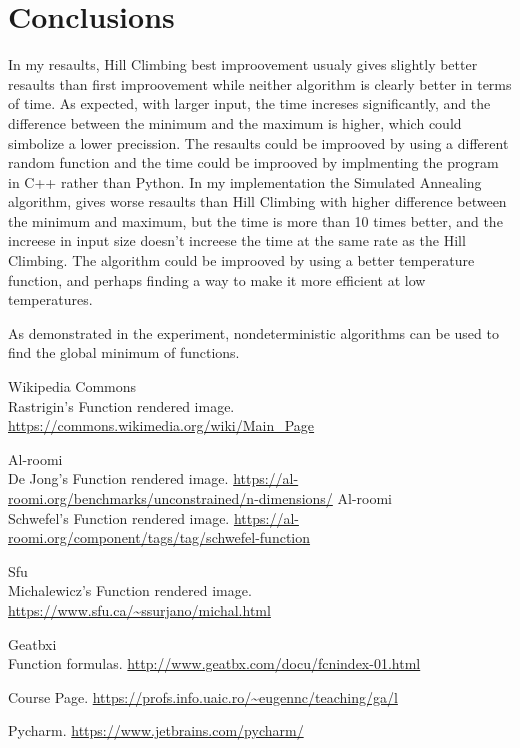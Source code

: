 \documentclass{report}
\begin{document}
\section{Conclusions}
In my resaults, Hill Climbing best improovement usualy gives slightly better resaults than first improovement while neither algorithm is clearly better in terms of time.
\newline
As expected, with larger input, the time increses significantly, and the difference between the minimum and the maximum is higher, which could simbolize a lower precission.
\newline
The resaults could be improoved by using a different random function and the time could be improoved by implmenting the program in C++ rather than Python.
\newline
In my implementation the Simulated Annealing algorithm, gives worse resaults than Hill Climbing with higher difference between the minimum and maximum, but the time is more than 10 times better, and the increese in input size doesn't increese the time at the same rate as the Hill Climbing. 
\newline
The algorithm could be improoved by using a better temperature function, and perhaps finding a way to make it more efficient at low temperatures.
\newline

As demonstrated in the experiment, nondeterministic algorithms can be used to find the global minimum of functions.


\begin{thebibliography}{9}

  Wikipedia Commons \\ Rastrigin's Function rendered image.
  \url{https://commons.wikimedia.org/wiki/Main_Page}

  Al-roomi  \\ De Jong's Function rendered image.
  \url{https://al-roomi.org/benchmarks/unconstrained/n-dimensions/}
  Al-roomi  \\ Schwefel's Function rendered image.
  \url{https://al-roomi.org/component/tags/tag/schwefel-function}

   Sfu \\ Michalewicz's Function rendered image.  
\url{https://www.sfu.ca/~ssurjano/michal.html}


  Geatbxi  \\ Function formulas.
  \url{http://www.geatbx.com/docu/fcnindex-01.html}

  Course Page.
  \url{https://profs.info.uaic.ro/~eugennc/teaching/ga/l}

  Pycharm.
  \url{https://www.jetbrains.com/pycharm/}


\end{thebibliography}  
\end{document}
